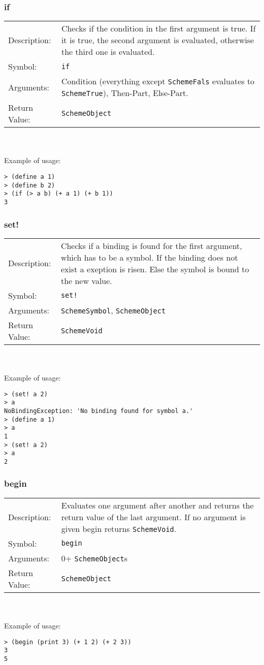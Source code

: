 \documentclass[12pt,a4paper]{scrartcl}
\begin{document}
\subsubsection{if}
\begin{tabular}{l  p{13cm}}
Description: & Checks if the condition in the first argument is true. If it is true, the second argument is evaluated, otherwise the third one is evaluated. \\
Symbol: & \lstinline{if}\\
Arguments: & Condition (everything except \lstinline{SchemeFals} evaluates to \lstinline{SchemeTrue}), Then-Part, Else-Part. \\
Return Value: & \lstinline{SchemeObject}\\
\end{tabular}
\\
\\
Example of usage:
\begin{lstlisting}
> (define a 1)
> (define b 2)
> (if (> a b) (+ a 1) (+ b 1))
3
\end{lstlisting}

\subsubsection{set!}
\begin{tabular}{l  p{13cm}}
Description: & Checks if a binding is found for the first argument, which has to be a symbol. If the binding does not exist a exeption is risen. Else the symbol is bound to the new value. \\
Symbol: & \lstinline{set!}\\
Arguments: & \lstinline{SchemeSymbol}, \lstinline{SchemeObject} \\
Return Value: & \lstinline{SchemeVoid}\\
\end{tabular}
\\
\\
Example of usage:
\begin{lstlisting}
> (set! a 2)
> a
NoBindingException: 'No binding found for symbol a.'
> (define a 1)
> a
1
> (set! a 2)
> a
2
\end{lstlisting}

\subsubsection*{begin}
\begin{tabular}{l  p{13cm}}
Description: & Evaluates one argument after another and returns the return value of the last argument. If no argument is given begin returns \lstinline{SchemeVoid}.\\
Symbol: & \lstinline{begin}\\
Arguments: & 0+ \lstinline{SchemeObject}s \\
Return Value: & \lstinline{SchemeObject} \\
\end{tabular}
\\
\\
Example of usage:
\begin{lstlisting}
> (begin (print 3) (+ 1 2) (+ 2 3))
3
5
\end{lstlisting}
\end{document}
